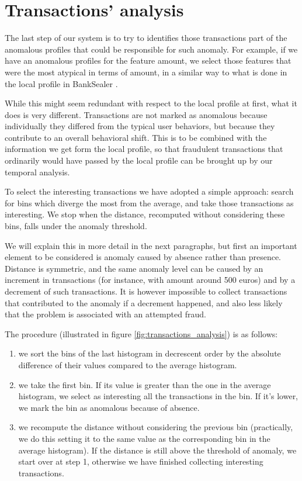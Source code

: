 \section{Transactions' analysis}
\label{sec:transactions_analysis}

The last step of our system is to try to identifies those transactions part of the anomalous profiles that could be responsible for such anomaly. For example, if we have an anomalous profiles for the feature amount, we select those features that were the most atypical in terms of amount, in a similar way to what is done in the local profile in BankSealer \cite{banksealer}.

While this might seem redundant with respect to the local profile at first, what it does is very different. Transactions are not marked as anomalous because individually they differed from the typical user behaviors, but because they contribute to an overall behavioral shift. This is to be combined with the information we get form the local profile, so that fraudulent transactions that ordinarily would have passed by the local profile can be brought up by our temporal analysis.

To select the interesting transactions we have adopted a simple approach: search for bins which diverge the most from the average, and take those transactions as interesting. We stop when the distance, recomputed without considering these bins, falls under the anomaly threshold.

We will explain this in more detail in the next paragraphs, but first an important element to be considered is anomaly caused by absence rather than presence. Distance is symmetric, and the same anomaly level can be caused by an increment in transactions (for instance, with amount around 500 euros) and by a decrement of such transactions. It is however impossible to collect transactions that contributed to the anomaly if a decrement happened, and also less likely that the problem is associated with an attempted fraud.

The procedure (illustrated in figure \ref{fig:transactions_analysis}) is as follows:

\begin{enumerate}
  \item we sort the bins of the last histogram in decrescent order by the absolute difference of their values compared to the average histogram.
  \item we take the first bin. If its value is greater than the one in the average histogram, we select as interesting all the transactions in the bin. If it's lower, we mark the bin as anomalous because of absence.
  \item we recompute the distance without considering the previous bin (practically, we do this setting it to the same value as the corresponding bin in the average histogram). If the distance is still above the threshold of anomaly, we start over at step 1, otherwise we have finished collecting interesting transactions.
\end{enumerate}

